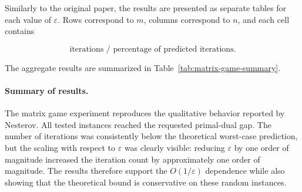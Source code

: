 \documentclass[11pt]{article}
\begin{document}
Similarly to the original paper, the results are presented as separate tables
for each value of \(\varepsilon\). Rows correspond to \(m\), columns correspond
to \(n\), and each cell contains

\[
    \text{iterations / percentage of predicted iterations}.
\]

\begin{table}[H]
    \centering
    
    \caption{Matrix game reproduction results for $\varepsilon=0.01$.
    Each cell shows iterations / percentage of predicted iterations.}
    \label{tab:reproduction-eps-001}
\end{table}

\begin{table}[H]
    \centering
    
    \caption{Matrix game reproduction results for $\varepsilon=0.001$.
    Each cell shows iterations / percentage of predicted iterations.}
    \label{tab:reproduction-eps-0001}
\end{table}

\begin{table}[H]
    \centering
    
    \caption{Matrix game reproduction results for $\varepsilon=0.0001$.
    Each cell shows iterations / percentage of predicted iterations.}
    \label{tab:reproduction-eps-00001}
\end{table}

The aggregate results are summarized in Table~\ref{tab:matrix-game-summary}.

\begin{table}[H]
    \centering
    
    \caption{Aggregate summary of the matrix game reproduction experiment.}
    \label{tab:matrix-game-summary}
\end{table}


\paragraph{Summary of results.}
The matrix game experiment reproduces the qualitative behavior reported by
Nesterov. All tested instances reached the requested primal-dual gap. The number
of iterations was consistently below the theoretical worst-case prediction, but
the scaling with respect to \(\varepsilon\) was clearly visible: reducing
\(\varepsilon\) by one order of magnitude increased the iteration count by
approximately one order of magnitude. The results therefore support the
\(O(1/\varepsilon)\) dependence while also showing that the theoretical bound is
conservative on these random instances.
\end{document}
